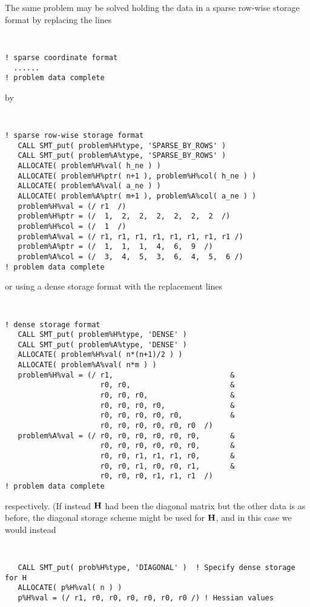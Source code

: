 \documentclass{galahad}
\begin{document}
\noindent
The same problem may be solved holding the data in 
a sparse row-wise storage format by replacing the lines
{\tt \small
\begin{verbatim}
! sparse coordinate format
  ......
! problem data complete
\end{verbatim}
}
\noindent
by
{\tt \small
\begin{verbatim}
! sparse row-wise storage format
   CALL SMT_put( problem%H%type, 'SPARSE_BY_ROWS' )
   CALL SMT_put( problem%A%type, 'SPARSE_BY_ROWS' )
   ALLOCATE( problem%H%val( h_ne ) )
   ALLOCATE( problem%H%ptr( n+1 ), problem%H%col( h_ne ) )
   ALLOCATE( problem%A%val( a_ne ) )
   ALLOCATE( problem%A%ptr( m+1 ), problem%A%col( a_ne ) )
   problem%H%val = (/ r1  /)
   problem%H%ptr = (/  1,  2,  2,  2,  2,  2,  2  /)
   problem%H%col = (/  1  /)
   problem%A%val = (/ r1, r1, r1, r1, r1, r1, r1, r1 /)
   problem%A%ptr = (/  1,  1,  1,  4,  6,  9  /)
   problem%A%col = (/  3,  4,  5,  3,  6,  4,  5,  6 /)
! problem data complete
\end{verbatim}
}
\noindent
or using a dense storage format with the replacement lines
{\tt \small
\begin{verbatim}
! dense storage format
   CALL SMT_put( problem%H%type, 'DENSE' )
   CALL SMT_put( problem%A%type, 'DENSE' )
   ALLOCATE( problem%H%val( n*(n+1)/2 ) )
   ALLOCATE( problem%A%val( n*m ) )
   problem%H%val = (/ r1,                           &
                      r0, r0,                       &
                      r0, r0, r0,                   &
                      r0, r0, r0, r0,               &
                      r0, r0, r0, r0, r0,           &
                      r0, r0, r0, r0, r0, r0  /)
   problem%A%val = (/ r0, r0, r0, r0, r0, r0,       &
                      r0, r0, r0, r0, r0, r0,       &
                      r0, r0, r1, r1, r1, r0,       &
                      r0, r0, r1, r0, r0, r1,       &
                      r0, r0, r0, r1, r1, r1  /)
! problem data complete
\end{verbatim}
}
\noindent
respectively.
(If instead ${\mathbf{H}}$ had been the diagonal matrix
but the other data is as before, the diagonal storage scheme 
might be used for ${\mathbf{H}}$, and in this case we would instead 
{\tt \small
\begin{verbatim}
   CALL SMT_put( prob%H%type, 'DIAGONAL' )  ! Specify dense storage for H
   ALLOCATE( p%H%val( n ) )
   p%H%val = (/ r1, r0, r0, r0, r0, r0, r0 /) ! Hessian values
\end{verbatim}
}
\end{document}
